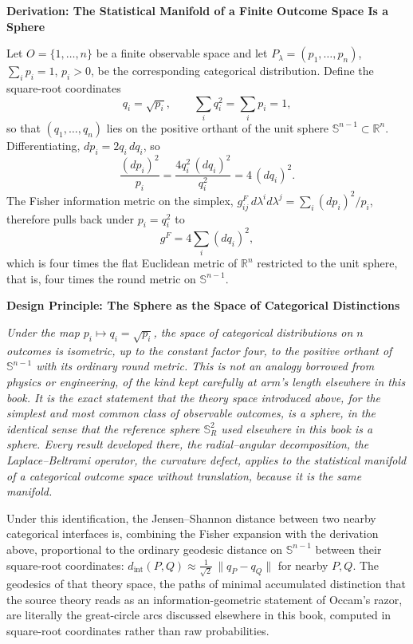\documentclass[11pt,fleqn]{book}
\numberwithin{equation}{chapter}
\newenvironment{principle}[1]
  {\begin{principleEnv}
   \noindent\textbf{Design Principle: #1}\par\smallskip\itshape}
  {\end{principleEnv}}
\newenvironment{derivation}[1]
  {\begin{derivationEnv}
   \noindent\textbf{Derivation: #1}\par\smallskip}
  {\end{derivationEnv}}
\theoremstyle{plain}
\theoremstyle{definition}
\theoremstyle{remark}
\newcommand{\Sphere}{\mathbb{S}^{2}}
\newcommand{\R}{\mathbb{R}}
\begin{document}
\begin{derivation}{The Statistical Manifold of a Finite Outcome Space Is a Sphere}
Let \(O=\{1,\dots,n\}\) be a finite observable space and let \(P_\lambda=(p_1,\dots,p_n)\), \(\sum_i p_i=1\), \(p_i>0\), be the corresponding categorical distribution. Define the square-root coordinates
\[
q_i = \sqrt{p_i}, \qquad \sum_i q_i^2 = \sum_i p_i = 1,
\]
so that \((q_1,\dots,q_n)\) lies on the positive orthant of the unit sphere \(\mathbb{S}^{n-1}\subset\R^n\). Differentiating, \(dp_i = 2q_i\,dq_i\), so
\[
\frac{(dp_i)^2}{p_i} = \frac{4q_i^2\,(dq_i)^2}{q_i^2} = 4\,(dq_i)^2.
\]
The Fisher information metric on the simplex, \(g^F_{ij}\,d\lambda^i d\lambda^j = \sum_i (dp_i)^2/p_i\), therefore pulls back under \(p_i=q_i^2\) to
\[
g^F = 4\sum_i (dq_i)^2,
\]
which is four times the flat Euclidean metric of \(\R^n\) restricted to the unit sphere, that is, four times the round metric on \(\mathbb{S}^{n-1}\).
\end{derivation}

\begin{principle}{The Sphere as the Space of Categorical Distinctions}
Under the map \(p_i\mapsto q_i=\sqrt{p_i}\), the space of categorical distributions on \(n\) outcomes is isometric, up to the constant factor four, to the positive orthant of \(\mathbb{S}^{n-1}\) with its ordinary round metric. This is not an analogy borrowed from physics or engineering, of the kind kept carefully at arm's length elsewhere in this book. It is the exact statement that the theory space introduced above, for the simplest and most common class of observable outcomes, \emph{is} a sphere, in the identical sense that the reference sphere \(\Sphere_R\) used elsewhere in this book is a sphere. Every result developed there, the radial--angular decomposition, the Laplace--Beltrami operator, the curvature defect, applies to the statistical manifold of a categorical outcome space without translation, because it is the same manifold.
\end{principle}

Under this identification, the Jensen--Shannon distance between two nearby categorical interfaces is, combining the Fisher expansion with the derivation above, proportional to the ordinary geodesic distance on \(\mathbb{S}^{n-1}\) between their square-root coordinates: \(d_{\mathrm{int}}(P,Q)\approx \tfrac{1}{\sqrt2}\,\|q_P - q_Q\|\) for nearby \(P,Q\). The geodesics of that theory space, the paths of minimal accumulated distinction that the source theory reads as an information-geometric statement of Occam's razor, are literally the great-circle arcs discussed elsewhere in this book, computed in square-root coordinates rather than raw probabilities.
\end{document}
